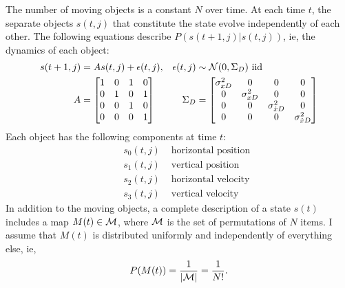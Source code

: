 \documentclass[12pt]{article}
\newcommand{\normal}[2]{{\cal N}(#1,#2)}
\newcommand{\xdot}{{\dot x}}
\newcommand{\M}{{\cal M}}
\newcommand{\ti}[2]{{#1}{(#2)}}                         %
\begin{document}
The number of moving objects is a constant $N$ over time.  At each
time $t$, the separate objects $\ti{s}{t,j}$ that constitute the state
evolve independently of each other.  The following equations describe
$P(\ti{s}{t+1,j}|\ti{s}{t,j})$, ie, the dynamics of each object:
\begin{subequations}
  \label{eq:dynamics}
  \begin{align}
    \ti{s}{t+1,j} &= A  \ti{s}{t,j} + \ti{\epsilon}{t,j}, &
    \ti{\epsilon}{t,j} &\sim \normal{0}{\Sigma_{D}} \text{ iid} \\
    A &= \begin{bmatrix}
      1 & 0 & 1 & 0 \\
      0 & 1 & 0 & 1 \\
      0 & 0 & 1 & 0 \\
      0 & 0 & 0 & 1
    \end{bmatrix} &
    \Sigma_{D} &= \begin{bmatrix}
      \sigma^2_{xD} & 0 & 0 & 0 \\
      0 & \sigma^2_{xD} & 0 & 0 \\
      0 & 0 & \sigma^2_{\xdot D} & 0 \\
      0 & 0 & 0 & \sigma^2_{\xdot D}
    \end{bmatrix}
  \end{align}
\end{subequations}
Each object has the following components at time $t$:
\begin{align*}
  &&s_{0}(t,j) & \text{ horizontal position} \\
  &&s_{1}(t,j) & \text{ vertical position} \\
  &&s_{2}(t,j) & \text{ horizontal velocity} \\
  &&s_{3}(t,j) & \text{ vertical velocity}
\end{align*}
In addition to the moving objects, a complete description of a state
$\ti{s}{t}$ includes a map $\ti{M}{t}\in \M$, where $\M$ is the set of
permutations of $N$ items.  I assume that $\ti{M}{t}$ is distributed
uniformly and independently of everything else, ie,
\begin{equation*}
  P(\ti{M}{t}) = \frac{1}{\left| \M\right|} =  \frac{1}{N!}.
\end{equation*}
\end{document}
